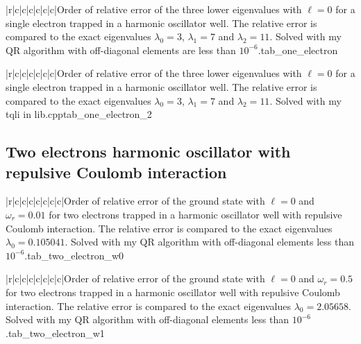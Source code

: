 \documentclass[11pt,english,a4paper]{article}
\begin{document}
\begin{flushleft}
\begin{tabell}{|r|c|c|c|c|c|c|}{\small}{}{}{Order of relative error of the three lower eigenvalues with $\ell = 0$ for a single electron trapped in a harmonic oscillator well. The relative error is compared to the exact eigenvalues  $\lambda_0 = 3$, $\lambda_1 = 7$ and $\lambda_2 = 11$. Solved with my QR algorithm with off-diagonal elements are less than $10^{-6}$.}{tab_one_electron}
\end{tabell}

\begin{tabell}{|r|c|c|c|c|c|c|}{\small}{}{}{Order of relative error of the three lower eigenvalues with $\ell = 0$ for a single electron trapped in a harmonic oscillator well. The relative error is compared to the exact eigenvalues  $\lambda_0 = 3$, $\lambda_1 = 7$ and $\lambda_2 = 11$. Solved with my tqli in lib.cpp}{tab_one_electron_2}
\end{tabell}

\subsection{Two electrons harmonic oscillator with repulsive Coulomb interaction}

\begin{tabell}{|r|c|c|c|c|c|c|c|}{\small}{}{}{Order of relative error of the ground state with $\ell = 0$ and $\omega_r = 0.01$ for two electrons trapped in a harmonic oscillator well with repulsive Coulomb interaction. The relative error is compared to the exact eigenvalues  $\lambda_0 = 0.105041$. Solved with my QR algorithm with off-diagonal elements less than $10^{-6}$.}{tab_two_electron_w0}
\end{tabell}

\begin{tabell}{|r|c|c|c|c|c|c|c|}{\small}{}{}{Order of relative error of the ground state with $\ell = 0$ and $\omega_r = 0.5$ for two electrons trapped in a harmonic oscillator well with repulsive Coulomb interaction. The relative error is compared to the exact eigenvalues  $\lambda_0 = 2.05658$. Solved with my QR algorithm with off-diagonal elements less than $10^{-6}$.}{tab_two_electron_w1}
\end{tabell}


\end{flushleft}
\end{document}
